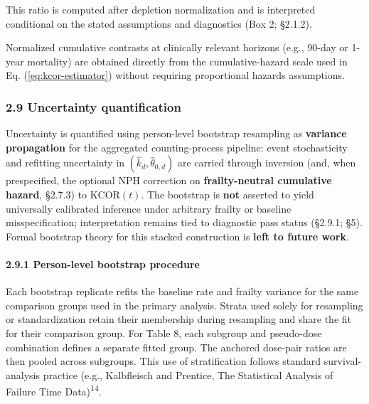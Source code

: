 \documentclass[
]{article}
\begin{document}
This ratio is computed after depletion normalization and is interpreted conditional on the stated assumptions and diagnostics (Box 2; §2.1.2).

Normalized cumulative contrasts at clinically relevant horizons (e.g., 90-day or 1-year mortality) are obtained directly from the cumulative-hazard scale used in Eq. (\ref{eq:kcor-estimator}) without requiring proportional hazards assumptions.

\subsubsection{2.9 Uncertainty quantification}\label{uncertainty-quantification}

Uncertainty is quantified using person-level bootstrap resampling as \textbf{variance propagation} for the aggregated counting-process pipeline: event stochasticity and refitting uncertainty in \((\hat{k}_d,\hat{\theta}_{0,d})\) are carried through inversion (and, when prespecified, the optional NPH correction on \textbf{frailty-neutral cumulative hazard}, §2.7.3) to \(\mathrm{KCOR}(t)\). The bootstrap is \textbf{not} asserted to yield universally calibrated inference under arbitrary frailty or baseline misspecification; interpretation remains tied to diagnostic pass status (§2.9.1; §5). Formal bootstrap theory for this stacked construction is \textbf{left to future work}.

\paragraph{2.9.1 Person-level bootstrap procedure}\label{person-level-bootstrap-procedure}

Each bootstrap replicate refits the baseline rate and frailty variance for the same comparison groups used in the primary analysis. Strata used solely for resampling or standardization retain their membership during resampling and share the fit for their comparison group. For Table 8, each subgroup and pseudo-dose combination defines a separate fitted group. The anchored dose-pair ratios are then pooled across subgroups. This use of stratification follows standard survival-analysis practice (e.g., Kalbfleisch and Prentice, The Statistical Analysis of Failure Time Data)\textsuperscript{14}.
\end{document}

